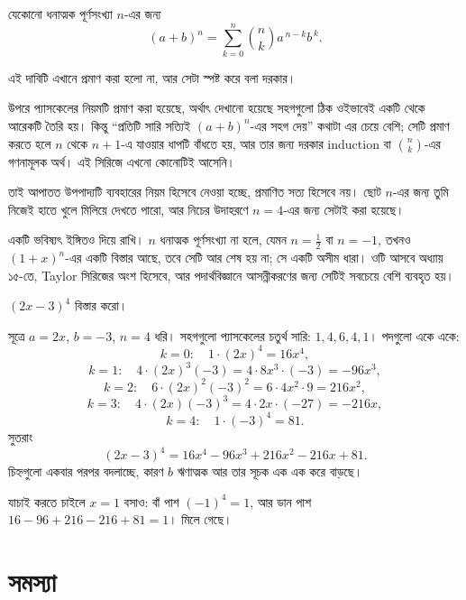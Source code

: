 \documentclass[11pt]{article}
\begin{document}
\begin{idea}[দ্বিপদী উপপাদ্য]
যেকোনো ধনাত্মক পূর্ণসংখ্যা $n$-এর জন্য
\[
  (a+b)^{n} = \sum_{k=0}^{n} \binom{n}{k} a^{\,n-k} b^{\,k} .
\]
\end{idea}

\begin{remark}
এই দাবিটি এখানে প্রমাণ করা হলো না, আর সেটা স্পষ্ট করে বলা দরকার।

উপরে প্যাসকেলের নিয়মটি প্রমাণ করা হয়েছে, অর্থাৎ দেখানো হয়েছে সহগগুলো ঠিক
ওইভাবেই একটি থেকে আরেকটি তৈরি হয়। কিন্তু ``প্রতিটি সারি সত্যিই $(a+b)^{n}$-এর
সহগ দেয়'' কথাটা এর চেয়ে বেশি; সেটি প্রমাণ করতে হলে $n$ থেকে $n+1$-এ যাওয়ার
ধাপটি বাঁধতে হয়, আর তার জন্য দরকার induction বা $\binom{n}{k}$-এর গণনামূলক
অর্থ। এই সিরিজে এখনো কোনোটিই আসেনি।

তাই আপাতত উপপাদ্যটি ব্যবহারের নিয়ম হিসেবে নেওয়া হচ্ছে, প্রমাণিত সত্য হিসেবে
নয়। ছোট $n$-এর জন্য তুমি নিজেই হাতে খুলে মিলিয়ে দেখতে পারো, আর নিচের উদাহরণে
$n = 4$-এর জন্য সেটাই করা হয়েছে।

একটি ভবিষ্যৎ ইঙ্গিতও দিয়ে রাখি। $n$ ধনাত্মক পূর্ণসংখ্যা না হলে, যেমন
$n = \tfrac{1}{2}$ বা $n = -1$, তখনও $(1+x)^{n}$-এর একটি বিস্তার আছে, তবে সেটি
আর শেষ হয় না; সে একটি অসীম ধারা। ওটি আসবে অধ্যায় ১৫-তে, Taylor সিরিজের
অংশ হিসেবে, আর পদার্থবিজ্ঞানে আসন্নীকরণের জন্য সেটিই সবচেয়ে বেশি ব্যবহৃত হয়।
\end{remark}

\begin{example}
$(2x - 3)^{4}$ বিস্তার করো।
\end{example}

\begin{solbox}
সূত্রে $a = 2x$, $b = -3$, $n = 4$ ধরি। সহগগুলো প্যাসকেলের চতুর্থ সারি:
$1, 4, 6, 4, 1$। পদগুলো একে একে:
\[
  k=0: \quad 1 \cdot (2x)^{4} = 16x^{4} ,
\]
\[
  k=1: \quad 4 \cdot (2x)^{3}(-3) = 4 \cdot 8x^{3} \cdot (-3) = -96x^{3} ,
\]
\[
  k=2: \quad 6 \cdot (2x)^{2}(-3)^{2} = 6 \cdot 4x^{2} \cdot 9 = 216x^{2} ,
\]
\[
  k=3: \quad 4 \cdot (2x)(-3)^{3} = 4 \cdot 2x \cdot (-27) = -216x ,
\]
\[
  k=4: \quad 1 \cdot (-3)^{4} = 81 .
\]
সুতরাং
\[
  (2x-3)^{4} = 16x^{4} - 96x^{3} + 216x^{2} - 216x + 81 .
\]
চিহ্নগুলো একবার পরপর বদলাচ্ছে, কারণ $b$ ঋণাত্মক আর তার সূচক এক এক করে বাড়ছে।

যাচাই করতে চাইলে $x = 1$ বসাও: বাঁ পাশ $(-1)^{4} = 1$, আর ডান পাশ
$16 - 96 + 216 - 216 + 81 = 1$। মিলে গেছে।
\end{solbox}

\section{সমস্যা}
\end{document}

